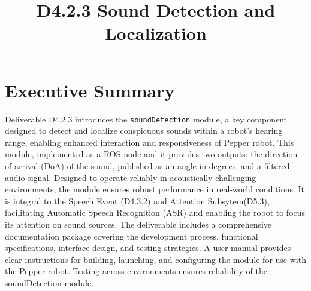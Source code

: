 \documentclass{CSSRforAfrica}
\begin{document}




\title{D4.2.3 Sound Detection and Localization}    

\partner{}                                      




\maketitle
 

\section*{Executive Summary}
\label{executive_summary}
Deliverable D4.2.3 introduces the \texttt{soundDetection} module, a key component designed to detect and localize conspicuous sounds within a robot's hearing range, enabling enhanced interaction and responsiveness of Pepper robot. This module, implemented as a ROS node and it provides two outputs: the direction of arrival (DoA) of the sound, published as an angle in degrees, and a filtered audio signal. Designed to operate reliably in acoustically challenging environments, the module ensures robust performance in real-world conditions. It is integral to the Speech Event (D4.3.2) and Attention Subsytem(D5.3), facilitating Automatic Speech Recognition (ASR) and enabling the robot to focus its attention on sound sources. The deliverable includes a comprehensive documentation package covering the development process, functional specifications, interface design, and testing strategies. A user manual provides clear instructions for building, launching, and configuring the module for use with the Pepper robot. Testing across environments ensures reliability of the soundDetection module.
\newpage
 
\pagebreak
\tableofcontents
\newpage
\end{document}

